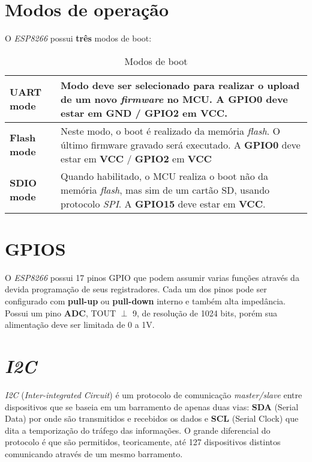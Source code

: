 \documentclass[
	11pt,				%
	openright,			%
	twoside,			%
	a5paper,			%
	english,			%
	french,				%
	spanish,			%
	brazil,				%
	sumario=tradicional
]{abntex2}
\begin{document}
\section{Modos de operação}
O \textit{ESP8266} possui \textbf{\textsf{três}} modos de boot: 

\begin{table}[!ht]
\centering
\footnotesize{
\label{Modos-Energia}
\caption{Modos de boot}
\begin{tabular}{>{\bfseries}lp{5.35cm}}
\toprule
UART mode & Modo deve ser selecionado para realizar o upload de um novo \textit{firmware} no MCU. A \textbf{\textsf{GPIO0}} deve estar em \textbf{\textsf{GND} / \textbf{\textsf{GPIO2}} em \textbf{\textsf{VCC}}}. \\\midrule
Flash mode & Neste modo, o boot é realizado da memória \textit{flash}. O último firmware gravado será executado. A \textbf{\textsf{GPIO0}} deve estar em \textbf{\textsf{VCC}} / \textbf{\textsf{GPIO2}} em \textbf{\textsf{VCC}} \\\midrule
SDIO mode & Quando habilitado, o MCU realiza o boot não da memória \textit{flash}, mas sim de um cartão SD, usando protocolo \textit{SPI}. A \textbf{\textsf{GPIO15}} deve estar em \textbf{\textsf{VCC}}. \\\bottomrule
\end{tabular}
}
\end{table}

\section{GPIOS}

O \textit{ESP8266} possui 17 pinos GPIO que podem assumir varias funções através da devida programação de seus registradores. Cada um dos pinos pode ser configurado com \textbf{\textsf{pull-up}} ou \textbf{\textsf{pull-down}} interno e também alta impedância. Possui um pino \textbf{\textsf{ADC}}, TOUT $\perp$ 9, de resolução de 1024 bits, porém sua alimentação deve ser limitada de 0 a 1V.


\section{\textit{I2C}}
    \textit{I2C} (\textit{Inter-integrated Circuit}) é um protocolo de comunicação \textit{master/slave} entre dispositivos que se baseia em um barramento de apenas duas vias: \textbf{\textsf{SDA}} (Serial Data) por onde são transmitidos e recebidos os dados e \textbf{\textsf{SCL}} (Serial Clock) que dita a temporização do tráfego das informações. O grande diferencial do protocolo é que são permitidos, teoricamente, até 127 dispositivos distintos comunicando através de um mesmo barramento.
    
\end{document}
